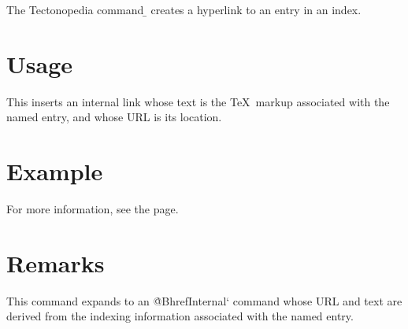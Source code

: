\tduxEmit %



The Tectonopedia command \b{\string\pediaLinkRef} creates a hyperlink to an
entry in an index.

\section*{Usage}

\begin{texdisp}
\end{texdisp}

This inserts an internal link whose text is the \TeX\ markup associated with
the named entry, and whose URL is its location.

\section*{Example}

\begin{texdisp}
For more information, see the  page.
\end{texdisp}

\section*{Remarks}

This command expands to an \`@BhrefInternal` command whose URL and text are
derived from the indexing information associated with the named entry.

